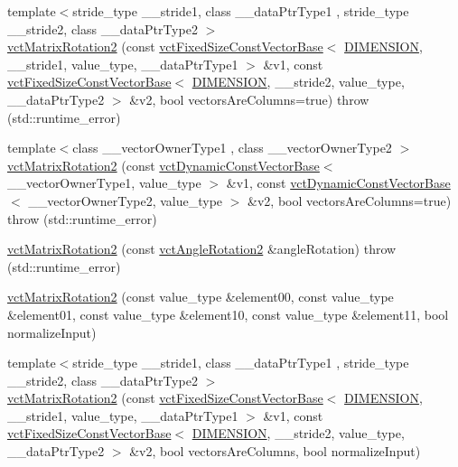 \begin{DoxyCompactItemize}
{\footnotesize template$<$stride\-\_\-type \-\_\-\-\_\-stride1, class \-\_\-\-\_\-data\-Ptr\-Type1 , stride\-\_\-type \-\_\-\-\_\-stride2, class \-\_\-\-\_\-data\-Ptr\-Type2 $>$ }\\\hyperlink{classvct_matrix_rotation2_a85adcb73000e860378122edc454c253d}{vct\-Matrix\-Rotation2} (const \hyperlink{classvct_fixed_size_const_vector_base}{vct\-Fixed\-Size\-Const\-Vector\-Base}$<$ \hyperlink{classvct_matrix_rotation2_adb5878f342cf4be98c9e6d79e9ae359ba3641e8aa72f502ddb4dc582365767927}{D\-I\-M\-E\-N\-S\-I\-O\-N}, \-\_\-\-\_\-stride1, value\-\_\-type, \-\_\-\-\_\-data\-Ptr\-Type1 $>$ \&v1, const \hyperlink{classvct_fixed_size_const_vector_base}{vct\-Fixed\-Size\-Const\-Vector\-Base}$<$ \hyperlink{classvct_matrix_rotation2_adb5878f342cf4be98c9e6d79e9ae359ba3641e8aa72f502ddb4dc582365767927}{D\-I\-M\-E\-N\-S\-I\-O\-N}, \-\_\-\-\_\-stride2, value\-\_\-type, \-\_\-\-\_\-data\-Ptr\-Type2 $>$ \&v2, bool vectors\-Are\-Columns=true)  throw (std\-::runtime\-\_\-error)
\item 
{\footnotesize template$<$class \-\_\-\-\_\-vector\-Owner\-Type1 , class \-\_\-\-\_\-vector\-Owner\-Type2 $>$ }\\\hyperlink{classvct_matrix_rotation2_accc53b158c75c8972a5fab7a56984550}{vct\-Matrix\-Rotation2} (const \hyperlink{classvct_dynamic_const_vector_base}{vct\-Dynamic\-Const\-Vector\-Base}$<$ \-\_\-\-\_\-vector\-Owner\-Type1, value\-\_\-type $>$ \&v1, const \hyperlink{classvct_dynamic_const_vector_base}{vct\-Dynamic\-Const\-Vector\-Base}$<$ \-\_\-\-\_\-vector\-Owner\-Type2, value\-\_\-type $>$ \&v2, bool vectors\-Are\-Columns=true)  throw (std\-::runtime\-\_\-error)
\item 
\hyperlink{classvct_matrix_rotation2_a752755ebba0ba8da35646e61f85345ac}{vct\-Matrix\-Rotation2} (const \hyperlink{classvct_angle_rotation2}{vct\-Angle\-Rotation2} \&angle\-Rotation)  throw (std\-::runtime\-\_\-error)
\item 
\hyperlink{classvct_matrix_rotation2_af9c21a048adcf506a61b298e51224ceb}{vct\-Matrix\-Rotation2} (const value\-\_\-type \&element00, const value\-\_\-type \&element01, const value\-\_\-type \&element10, const value\-\_\-type \&element11, bool normalize\-Input)
\item 
{\footnotesize template$<$stride\-\_\-type \-\_\-\-\_\-stride1, class \-\_\-\-\_\-data\-Ptr\-Type1 , stride\-\_\-type \-\_\-\-\_\-stride2, class \-\_\-\-\_\-data\-Ptr\-Type2 $>$ }\\\hyperlink{classvct_matrix_rotation2_a4eba73f44c9fedf50c4cfd901c0d1cb9}{vct\-Matrix\-Rotation2} (const \hyperlink{classvct_fixed_size_const_vector_base}{vct\-Fixed\-Size\-Const\-Vector\-Base}$<$ \hyperlink{classvct_matrix_rotation2_adb5878f342cf4be98c9e6d79e9ae359ba3641e8aa72f502ddb4dc582365767927}{D\-I\-M\-E\-N\-S\-I\-O\-N}, \-\_\-\-\_\-stride1, value\-\_\-type, \-\_\-\-\_\-data\-Ptr\-Type1 $>$ \&v1, const \hyperlink{classvct_fixed_size_const_vector_base}{vct\-Fixed\-Size\-Const\-Vector\-Base}$<$ \hyperlink{classvct_matrix_rotation2_adb5878f342cf4be98c9e6d79e9ae359ba3641e8aa72f502ddb4dc582365767927}{D\-I\-M\-E\-N\-S\-I\-O\-N}, \-\_\-\-\_\-stride2, value\-\_\-type, \-\_\-\-\_\-data\-Ptr\-Type2 $>$ \&v2, bool vectors\-Are\-Columns, bool normalize\-Input)

\end{DoxyCompactItemize}
